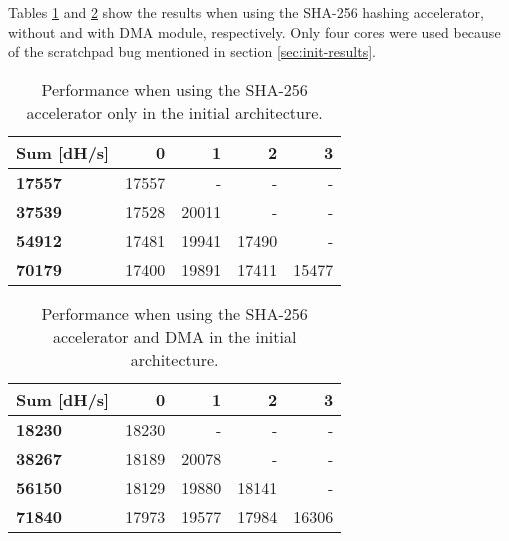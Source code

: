 \begin{appendix}
Tables \ref{tab:Perf-SHA1} and \ref{tab:Perf-SHADMA1} show the results when using the SHA-256 hashing accelerator, without and with DMA module, respectively.
Only four cores were used because of the scratchpad bug mentioned in section \ref{sec:init-results}.


\begin{table}
\centering
\begin{tabular}{| l || r r r r |}
  \hline 
  \textbf{Sum} [dH/s] & \textbf{0} & \textbf{1} & \textbf{2} & \textbf{3}\\
  \hline                       
  \textbf{17557} & 17557 & - & - & - \\
  \textbf{37539} & 17528 & 20011 & - & - \\
  \textbf{54912} & 17481 & 19941 & 17490 & - \\
  \textbf{70179} & 17400 & 19891 & 17411 & 15477 \\
  \hline  
\end{tabular}
\caption{Performance when using the SHA-256 accelerator only in the initial architecture.}
\label{tab:Perf-SHA1}
\end{table}


\begin{table}
\centering
\begin{tabular}{| l || r r r r |}
  \hline 
  \textbf{Sum} [dH/s] & \textbf{0} & \textbf{1} & \textbf{2} & \textbf{3}\\
  \hline                       
  \textbf{18230} & 18230 & - & - & - \\
  \textbf{38267} & 18189 & 20078 & - & - \\
  \textbf{56150} & 18129 & 19880 & 18141 & - \\
  \textbf{71840} & 17973 & 19577 & 17984 & 16306 \\
  \hline  
\end{tabular}
\caption{Performance when using the SHA-256 accelerator and DMA in the initial architecture.}
\label{tab:Perf-SHADMA1}
\end{table}
		

\end{appendix}
